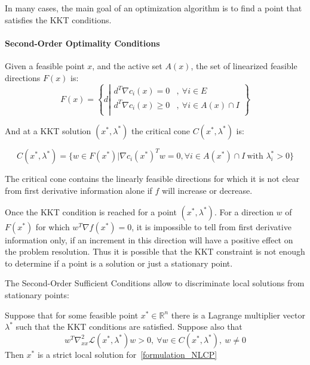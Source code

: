 In many cases, the main goal of an optimization algorithm is to find a point that satisfies the KKT conditions.

\paragraph{Second-Order Optimality Conditions}

\begin{definition}
  Given a feasible point $x$, and the active set $\mathit{A}(x)$, the  set of linearized feasible directions $F(x)$ is:
  \begin{equation}
    F(x)=\left\{d\left|
        \begin{array}{ll}
          d^T\nabla c_i(x) = 0&,\ \forall i\in E \\
          d^T\nabla c_i(x) \geq 0&,\ \forall i\in \mathit{A}(x)\cap I \\
        \end{array}
        \right.
    \right\}
  \end{equation}
\end{definition}

And at a KKT solution $(x^*,\lambda^*)$ the critical cone $C(x^*, \lambda^*)$ is:

\begin{equation}
  C(x^*,\lambda^*) = \{w\in F(x^*)|{\nabla c_i(x^*)}^T w=0, \forall i\in\mathit{A}(x^*)\cap I\ \text{with } \lambda_i^*>0\}
\end{equation}

The critical cone contains the linearly feasible directions for which it is not clear from first derivative information alone if $f$ will increase or decrease.

Once the KKT condition is reached for a point $(x^*, \lambda^*)$.
For a direction $w$ of $F(x^*)$ for which $w^T\nabla f(x^*)=0$, it is impossible to tell from first derivative information only, if an increment in this direction will have a positive effect on the problem resolution.
Thus it is possible that the KKT constraint is not enough to determine if a point is a solution or just a stationary point.

The Second-Order Sufficient Conditions allow to discriminate local solutions from stationary points:

\begin{theorem}
  Suppose that for some feasible point $x^*\in \mathbb{R}^n$ there is a Lagrange multiplier vector $\lambda^*$ such that the KKT conditions are satisfied. Suppose also that
  \begin{equation}
    w^T\nabla_{xx}^2\mathcal{L}(x^*,\lambda^*)w>0,\ \forall w\in C(x^*,\lambda^*),\ w\neq 0
  \end{equation}
  Then $x^*$ is a strict local solution for~\ref{formulation_NLCP}
\end{theorem}

